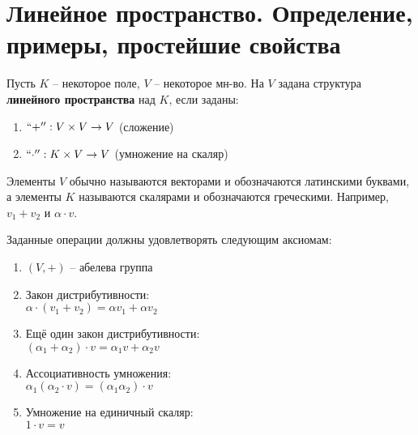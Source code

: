 
\section{Линейное пространство. Определение, примеры, простейшие свойства}

\begin{conj}
    Пусть $K$ -- некоторое поле, $V$ -- некоторое мн-во.
    На $V$ задана структура \textbf{линейного пространства} над $K$, 
    если заданы:
    \begin{enumerate}
        \item $``+'' : V \times V \rightarrow V$ (сложение)
        \item $``\cdot'' : K \times V \rightarrow V$ (умножение на скаляр) 
    \end{enumerate}

    Элементы $V$ обычно называются векторами и обозначаются латинскими
    буквами, а элементы $K$ называются скалярами и обозначаются греческими.
    Например, $v_1 + v_2$ и $\alpha \cdot v$.

    Заданные операции должны удовлетворять следующим аксиомам:
    \begin{enumerate}
        \item $(V, +)$ -- абелева группа
        \item Закон дистрибутивности: \\
        $\alpha \cdot (v_1 + v_2) = \alpha v_1 + \alpha v_2$
        \item Ещё один закон дистрибутивности: \\
        $(\alpha_1 + \alpha_2) \cdot v = \alpha_1 v + \alpha_2 v$
        \item Ассоциативность умножения:\\
        $ \alpha_1 (\alpha_2 \cdot v) = (\alpha_1 \alpha_2) \cdot v $
        \item Умножение на единичный скаляр: \\
        $ 1 \cdot v = v $
    \end{enumerate}
\end{conj}

